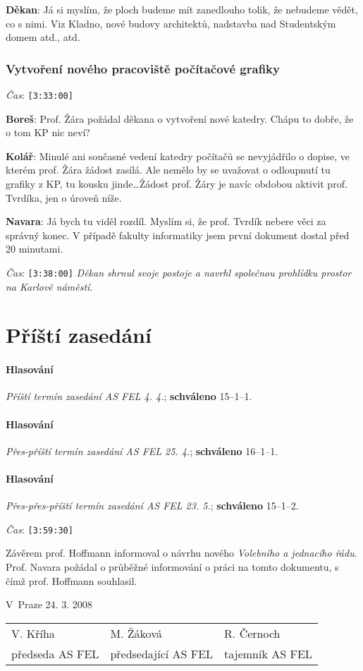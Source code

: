 \documentclass[a4paper,10pt,notitlepage]{article}
\newcommand{\ts}[1]{\texttt{[#1]}}
\newcommand{\tsp}[1]{\noindent \textit{Čas}: \ts{#1}}
\newcommand{\cl}[1]{\noindent \textbf{#1}:}
\newcommand{\hl}[3]{\paragraph{Hlasování} \textit{#1}; \textbf{#3} #2.}
\begin{document}
\cl{Děkan} Já si myslím, že ploch budeme mít zanedlouho tolik, že nebudeme vědět, co s nimi. Viz Kladno, nové budovy architektů, nadstavba nad Studentským domem atd., atd.


\subsubsection{Vytvoření nového pracoviště počítačové grafiky}

\tsp{3:33:00}

\cl{Boreš} Prof. Žára požádal děkana o vytvoření nové katedry. Chápu to dobře, že o tom KP nic neví?

\cl{Kolář} Minulé ani současné vedení katedry počítačů se nevyjádřilo o dopise, ve kterém prof. Žára žádost zasílá. Ale nemělo by se uvažovat o odloupnutí tu grafiky z KP, tu kousku jinde\dots Žádost prof. Žáry je navíc obdobou aktivit prof. Tvrdíka, jen o úroveň níže.

\cl{Navara} Já bych tu viděl rozdíl. Myslím si, že prof. Tvrdík nebere věci za správný konec. V případě fakulty informatiky jsem první dokument dostal před 20 minutami.

\tsp{3:38:00} \textit{Děkan shrnul svoje postoje a navrhl společnou prohlídku prostor na Karlově náměstí.}



\section{Příští zasedání}

\hl{Příští termín zasedání AS FEL 4. 4.}{15--1--1}{schváleno}
\hl{Přes-příští termín zasedání AS FEL 25. 4.}{16--1--1}{schváleno}
\hl{Přes-přes-příští termín zasedání AS FEL 23. 5.}{15--1--2}{schváleno}

\medskip

\tsp{3:59:30}

Závěrem prof. Hoffmann informoval o návrhu nového \textit{Volebního a jednacího řádu}. Prof. Navara požádal o průběžné informování o práci na tomto dokumentu, s čímž prof. Hoffmann souhlasil.



\bigskip\bigskip\bigskip\bigskip\bigskip\bigskip\bigskip\bigskip\bigskip

V~Praze 24. 3. 2008

\bigskip\bigskip

\begin{center}
\begin{tabular}{p{4cm}p{4cm}p{4cm}}
V. Kříha & M. Žáková & R. Černoch \\
předseda AS FEL & předsedající AS FEL & tajemník AS FEL
\end{tabular}
\end{center}
\end{document}
